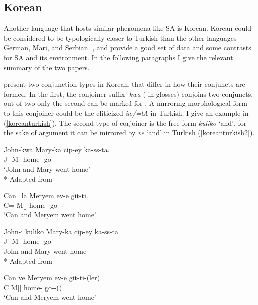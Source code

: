 \subsection{Korean}

Another language that hosts similar phenomena like SA is Korean. Korean could be considered to be typologically closer to Turkish than the other languages German, Mari, and Serbian. \cite{yoon2005conjunction}, and \cite{yoon2017lexical} provide a good set of data and some contrasts for SA and its environment. In the following paragraphs I give the relevant summary of the two papers.

\cite{yoon2005conjunction} present two conjunction types in Korean, that differ in how their conjuncts are formed. In the first, the conjoiner suffix \textit{-kwa} ({\And} in glosses) conjoins two conjuncts, out of two only the second can be marked for {\Case}. A mirroring morphological form to this conjoiner could be the cliticized \textit{ile/=lA} in Turkish. I give an example in (\ref{koreanturkish}). The second type of conjoiner is the free form \textit{kuliko} `and', for the sake of argument it can be mirrored by \textit{ve} `and' in Turkish (\ref{koreanturkish2}).

\begin{exe}
    \ex \label{koreanturkish}
    \begin{xlist}
        \ex \gll John-kwa Mary-ka cip-ey ka-ss-ta. \\ 
        J-{\And} M-{\Nom} home-{\Loc} go-{\Pst}-{\Decl} \\
        \glt `John and Mary went home'\\*   
        \hfill Adapted from \cite{yoon2005conjunction}

        \ex \gll Can=la Meryem ev-e git-ti. \\ 
        C={\And} M[{\Nom}] home-{\Dat} go-{\Pst} \\
        \glt `Can and Meryem went home'
    \end{xlist}

    \ex \label{koreanturkish2}
    \begin{xlist}
        \ex \gll John-i kuliko Mary-ka cip-ey ka-ss-ta \\ 
        J-{\Nom} {\And} M-{\Nom} home-{\Loc} go-{\Pst}-{\Decl} \\
        \glt John and Mary went home\\* 
        \hfill Adapted from \cite{yoon2005conjunction}
        
        \ex \gll Can ve Meryem ev-e git-ti-(ler) \\ 
        C {\And} M[{\Nom}] home-{\Dat} go-{\Pst}-({\Tpl}) \\
        \glt `Can and Meryem went home'
    \end{xlist}
\end{exe}

